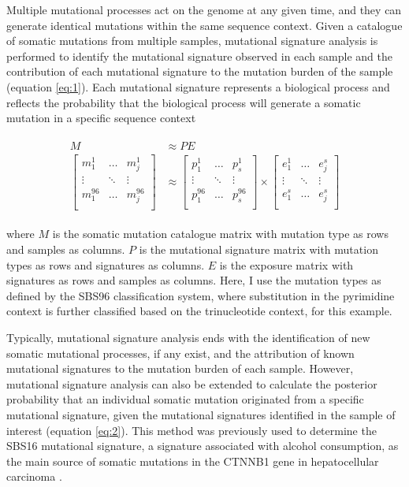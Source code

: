 Multiple mutational processes act on the genome at any given time, and they can generate identical mutations within the same sequence context. Given a catalogue of somatic mutations from multiple samples, mutational signature analysis is performed to identify the mutational signature observed in each sample and the contribution of each mutational signature to the mutation burden of the sample (equation \ref{eq:1}). Each mutational signature represents a biological process and reflects the probability that the biological process will generate a somatic mutation in a specific sequence context 

\begin{align}
\begin{split} 
M &\approx PE \label{eq:1} \\
\begin{bmatrix}
    m^{1}_{1} & \dots & m^{1}_{j} \\
    \vdots & \ddots & \vdots \\
    m^{96}_{1} & \dots & m^{96}_{j} \\
\end{bmatrix} &\approx
\begin{bmatrix}
    p^{1}_{1} & \dots & p^{1}_{s} \\
    \vdots & \ddots & \vdots \\
    p^{96}_{1} & \dots & p^{96}_{s} \\
\end{bmatrix} \times
\begin{bmatrix}
    e^{1}_{1} & \dots & e^{s}_{j} \\
    \vdots & \ddots & \vdots \\
    e^{s}_{1} & \dots & e^{s}_{j} \\
\end{bmatrix} 
\end{split}
\end{align}

where $M$ is the somatic mutation catalogue matrix with mutation type as rows and samples as columns. $P$ is the mutational signature matrix with mutation types as rows and signatures as columns. $E$ is the exposure matrix with signatures as rows and samples as columns. Here, I use the mutation types as defined by the SBS96 classification system, where substitution in the pyrimidine context is further classified based on the trinucleotide context, for this example.

Typically, mutational signature analysis ends with the identification of new somatic mutational processes, if any exist, and the attribution of known mutational signatures to the mutation burden of each sample. However, mutational signature analysis can also be extended to calculate the posterior probability that an individual somatic mutation originated from a specific mutational signature, given the mutational signatures identified in the sample of interest (equation \ref{eq:2}). This method was previously used to determine the SBS16 mutational signature, a signature associated with alcohol consumption, as the main source of somatic mutations in the CTNNB1 gene in hepatocellular carcinoma \cite{Letouze2017-tl}. 

